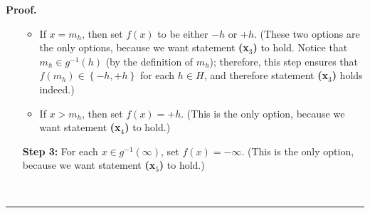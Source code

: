 \documentclass[numbers=enddot,12pt,final,onecolumn,notitlepage]{scrartcl}%
\theoremstyle{definition}
\newenvironment{proof}[1][Proof]{\noindent\textbf{#1.} }{\ \rule{0.5em}{0.5em}}
\newenvironment{verlong}{}{}
\begin{document}
\begin{verlong}
\begin{proof}
\begin{itemize}
\begin{itemize}
\item If $x=m_{h}$, then set $f\left(  x\right)  $ to be either $-h$ or $+h$.
(These two options are the only options, because we want statement
\textbf{(x}$_{3}$\textbf{)} to hold. Notice that $m_{h}\in g^{-1}\left(
h\right)  $ (by the definition of $m_{h}$); therefore, this step ensures that
$f\left(  m_{h}\right)  \in\left\{  -h,+h\right\}  $ for each $h\in H$, and
therefore statement \textbf{(x}$_{3}$\textbf{)} holds indeed.)

\item If $x>m_{h}$, then set $f\left(  x\right)  =+h$. (This is the only
option, because we want statement \textbf{(x}$_{4}$\textbf{)} to hold.)
\end{itemize}

\item[\textbf{Step 3:}] For each $x\in g^{-1}\left(  \infty\right)  $, set
$f\left(  x\right)  =-\infty$. (This is the only option, because we want
statement \textbf{(x}$_{5}$\textbf{)} to hold.)
\end{itemize}


\end{proof}
\end{verlong}
\end{document}
